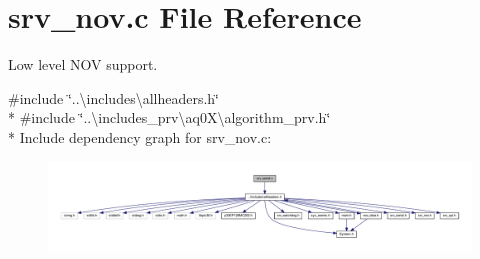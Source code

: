 \hypertarget{a00060}{\section{srv\+\_\+nov.\+c File Reference}
\label{a00060}
}


Low level N\+O\+V support.  


{\ttfamily \#include \char`\"{}..\textbackslash{}includes\textbackslash{}allheaders.\+h\char`\"{}}\\*
{\ttfamily \#include \char`\"{}..\textbackslash{}includes\+\_\+prv\textbackslash{}aq0\+X\textbackslash{}algorithm\+\_\+prv.\+h\char`\"{}}\\*
Include dependency graph for srv\+\_\+nov.\+c\+:\nopagebreak
\begin{figure}[H]
\begin{center}
\leavevmode
\includegraphics[width=350pt]{de/d96/a01685}
\end{center}
\end{figure}
